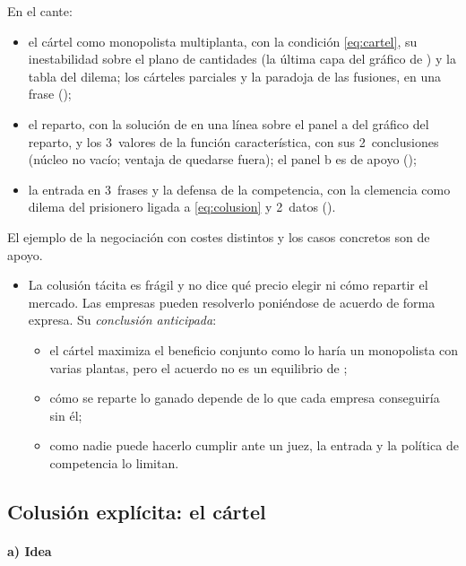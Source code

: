 \documentclass[11pt]{article}
\begin{document}
\begin{notaopositor}
En el cante:
\begin{itemize}
\item el cártel como monopolista multiplanta, con la condición \eqref{eq:cartel}, su inestabilidad sobre el plano de cantidades (la última capa del gráfico de ) y la tabla del dilema; los cárteles parciales y la paradoja de las fusiones, en una frase ();
\item el reparto, con la solución de  en una línea sobre el panel a del gráfico del reparto, y los 3~valores de la función característica, con sus 2~conclusiones (núcleo no vacío; ventaja de quedarse fuera); el panel b es de apoyo ();
\item la entrada en 3~frases y la defensa de la competencia, con la clemencia como dilema del prisionero ligada a \eqref{eq:colusion} y 2~datos ().
\end{itemize}
El ejemplo de la negociación con costes distintos y los casos concretos son de apoyo.
\end{notaopositor}

\begin{itemize}
\item La colusión tácita es frágil y no dice qué precio elegir ni cómo repartir el mercado. Las empresas pueden resolverlo poniéndose de acuerdo de forma expresa. Su \emph{conclusión anticipada}:
  \begin{itemize}
  \item el cártel maximiza el beneficio conjunto como lo haría un monopolista con varias plantas, pero el acuerdo no es un equilibrio de ;
  \item cómo se reparte lo ganado depende de lo que cada empresa conseguiría sin él;
  \item como nadie puede hacerlo cumplir ante un juez, la entrada y la política de competencia lo limitan.
  \end{itemize}
\end{itemize}

\subsection{Colusión explícita: el cártel}\label{sec:cartel}

\paragraph{a) Idea}
\end{document}
